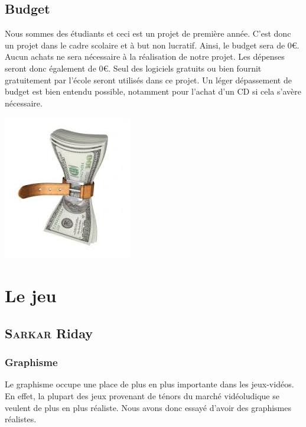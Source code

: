 \documentclass[a4paper, 12pt]{article}
\begin{document}
\subsection{Budget}

Nous sommes des étudiants et ceci est un projet de première année. C'est donc un projet dans le cadre scolaire et à but non lucratif. Ainsi, le budget sera de 0\euro{}. Aucun achats ne sera nécessaire à la réalisation de notre projet. Les dépenses seront donc également de 0\euro{}. Seul des logiciels gratuits ou bien fournit gratuitement par l'école seront utilisés dans ce projet. Un léger dépassement de budget est bien entendu possible, notamment pour l'achat d'un CD si cela s'avère nécessaire.\\
\centerline{\includegraphics[scale=0.7]{images.jpg}}
\newpage
\section{Le jeu}
	\subsection{\textsc{Sarkar} Riday}
	
	\subsubsection{Graphisme}
Le graphisme occupe une place de plus en plus importante dans les jeux-vidéos. En effet, la plupart des jeux provenant de ténors du marché vidéoludique se veulent de plus en plus réaliste. Nous avons donc essayé d’avoir des graphismes réalistes.
\end{document}
